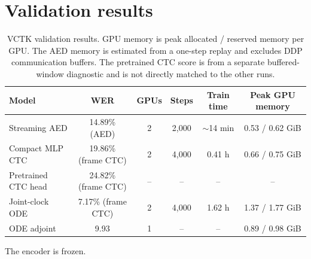 
\section{Validation results}

  \begin{table}[ht]
  \centering
  \small
  \begin{tabular}{lccccc}
  \hline
  Model & WER & GPUs & Steps & Train time & Peak GPU memory \\
  \hline
  Streaming AED
    & 14.89\% (AED) & 2 & 2{,}000 & $\sim$14 min
    & 0.53 / 0.62 GiB \\
  Compact MLP CTC
    & 19.86\% (frame CTC) & 2 & 4{,}000 & 0.41 h
    & 0.66 / 0.75 GiB \\
  Pretrained CTC head
    & 24.82\% (frame CTC) & -- & -- & --
    & -- \\
  Joint-clock ODE
    & 7.17\% (frame CTC)
    & 2 & 4{,}000 & 1.62 h & 1.37 / 1.77 GiB \\
    ODE adjoint
    & 9.93 & 1 & -- & -- & 0.89 / 0.98 GiB \\
  \hline
  \end{tabular}
  \caption{VCTK validation results. GPU memory is peak allocated / reserved
  memory per GPU. The AED memory is estimated from a one-step replay and excludes
  DDP communication buffers. The pretrained CTC score is from a separate
  buffered-window diagnostic and is not directly matched to the other runs.}
  \label{tab:streaming-asr-results}
  \end{table}

  The encoder is frozen.

